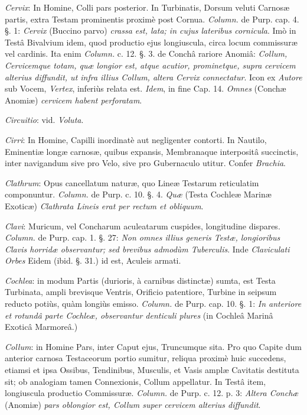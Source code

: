 \documentclass[a4paper, 11pt, oneside, polutonikogreek, german]{article}
\begin{document}
\emph{Cervix}: In Homine, Colli pars posterior. In Turbinatis, Dorsum veluti Carnosæ partis, extra Testam prominentis proximè post Cornua. \emph{Column.} de Purp. cap. 4. §. 1: \emph{Cervix} (Buccino parvo) \emph{crassa est, lata; in cujus lateribus cornicula}. Imò in Testâ Bivalvium idem, quod productio ejus longiuscula, circa locum commissuræ vel cardinis. Ita enim \emph{Column.} c. 12. §. 3. de Conchâ rariore Anomiâ: \emph{Collum, Cervicemque totam, quæ longior est, atque acutior, prominetque, supra cervicem alterius diffundit, ut infra illius Collum, altera Cervix connectatur}. Icon ex \emph{Autore} sub Vocem, \emph{Vertex}, inferiùs relata est. \emph{Idem}, in fine Cap. 14. \emph{Omnes} (Conchæ Anomiæ) \emph{cervicem habent perforatam}.

\emph{Circuitio}: vid. \emph{Voluta}.

\emph{Cirri}: In Homine, Capilli inordinatè aut negligenter contorti. In Nautilo, Eminentiæ longæ carnosæ, quibus expansis, Membranaque interpositâ succinctis, inter navigandum sive pro Velo, sive pro Gubernaculo utitur. Confer \emph{Brachia}.

\emph{Clathrum}: Opus cancellatum naturæ, quo Lineæ Testarum reticulatim componuntur. \emph{Column.} de Purp. c. 10. §. 4. \emph{Quæ} (Testa Cochleæ Marinæ Exoticæ) \emph{Clathrata Lineis erat per rectum et obliquum}.

\emph{Clavi}: Muricum, vel Concharum aculeatarum cuspides, longitudine dispares. \emph{Column.} de Purp. cap. 1. §. 27: \emph{Non omnes illius generis Testæ, longioribus Clavis horridæ observantur; sed brevibus admodùm Tuberculis}. Inde \emph{Claviculati Orbes} Eidem (ibid. §. 31.) id est, Aculeis armati.

\emph{Cochlea}: in modum Partis (durioris, à carnibus distinctæ) sumta, est Testa Turbinata, ampli brevisque Ventris, Orificio patentiore, Turbine in seipsum reducto potiùs, quàm longiùs emisso. \emph{Column.} de Purp. cap. 10. §. 1: \emph{In anteriore et rotundâ parte Cochleæ, observantur denticuli plures} (in Cochleâ Marinâ Exoticâ Marmoreâ.)

\emph{Collum}: in Homine Pars, inter Caput ejus, Truncumque sita. Pro quo Capite dum anterior carnosa Testaceorum portio sumitur, reliqua proximè huic succedens, etiamsi et ipsa Ossibus, Tendinibus, Musculis, et Vasis amplæ Cavitatis destituta sit; ob analogiam tamen Connexionis, Collum appellatur. In Testâ item, longiuscula productio Commissuræ. \emph{Column.} de Purp. c. 12. p. 3: \emph{Altera Conchæ} (Anomiæ) \emph{pars oblongior est, Collum super cervicem alterius diffundit}.
\end{document}

